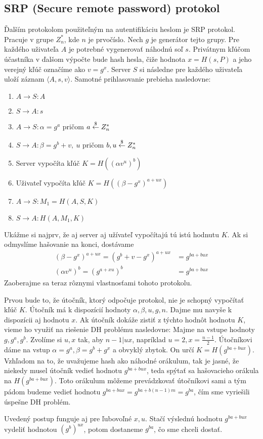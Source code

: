 \subsection{SRP (Secure remote password) protokol}

Ďalším protokolom použiteľným na autentifikáciu heslom je SRP protokol.
Pracuje v grupe $Z_n^{*}$, kde $n$ je prvočíslo. Nech $g$ je generátor
tejto grupy.
Pre každého uživateľa $A$ je potrebné vygenerovať náhodnú soľ $s$.
Privátnym kľúčom účastníka v ďalšom výpočte bude hash hesla, čiže
hodnota $x = H(s,P)$ a jeho verejný kľúč označíme ako $v = g^x$.
Server $S$ si následne
pre každého uživateľa uloží záznam $\langle A, s, v \rangle$.
Samotné prihlasovanie prebieha nasledovne:
\begin{enumerate}
\item $A\to S\colon A$
\item $S\to A\colon s$
\item $A\to S\colon \alpha = g^a$ pričom $a \overset{\$}{\leftarrow} Z_n^{*}$
\item $S\to A\colon \beta = g^b + v,\ u$ pričom $b,u \overset{\$}{\leftarrow} Z_n^{*}$
\item Server vypočíta kľúč $K = H((\alpha v^u)^b)$
\item Uživateľ vypočíta kľúč $K = H((\beta - g^x)^{a+ux})$
\item $A\to S\colon M_1 = H(A,S,K)$
\item $S\to A\colon H(A,M_1,K)$
\end{enumerate}

Ukážme si najprv, že aj server aj užívateľ vypočítajú tú istú hodnutu $K$.
Ak si odmyslíme hašovanie na konci, dostávame
\begin{align*}
(\beta - g^x)^{a+ux} = (g^b + v - g^x)^{a+ux} &= g^{ba+bux}\\
(\alpha v^u)^b = (g^{a+xu})^b &= g^{ba+bux}
\end{align*}
Zaoberajme sa teraz rôznymi vlastnosťami tohoto protokolu.

Prvou bude to, že útočník, ktorý odpočuje protokol,
nie je schopný vypočítať kľúč $K$.
Útočník má k dispozícií hodnoty $\alpha, \beta, u, g, n$.
Dajme mu navyše k dispozícii aj hodnotu $x$.
Ak útočník dokáže zistiť z týchto hodnôt hodnotu $K$,
vieme ho využiť na riešenie DH problému nasledovne:
Majme na vstupe hodnoty $g, g^a, g^b$. Zvolíme si $u,x$ tak, 
aby $n-1 | ux$, napríklad $u = 2, x = \frac{n-1}{2}$.
Útočníkovi dáme na vstup $\alpha = g^a, \beta = g^b + g^x$ a obvyklý zbytok.
On určí $K = H(g^{ba+bux})$. 
Vzhľadom na to, že uvažujeme hash ako náhodné orákulum,
tak je jasné, že niekedy musel útočník vedieť hodnotu $g^{ba+bux}$,
teda spýtať sa hašovacieho orákula na $H(g^{ba+bux})$.
Toto orákulum môžeme prevádzkovať útočníkovi sami a
tým pádom budeme vedieť hodnotu
$g^{ba+bux} = g^{ba+b(n-1)m} = g^{ba}$,
čím sme vyriešili úspešne DH problém.

\begin{poznamka}
Uvedený postup funguje aj pre ľubovoľné $x, u$. Stačí výslednú hodnotu
$g^{ba+bux}$ vydeliť hodnotou $(g^b)^{ux}$, potom dostaneme $g^{ba}$, čo sme chceli dostať.
\end{poznamka}

